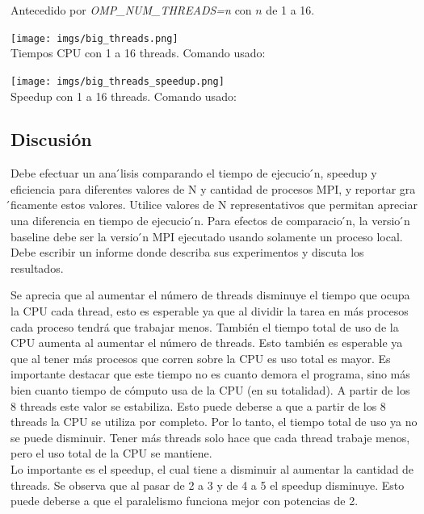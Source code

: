 \documentclass[10pt]{extarticle}
\begin{document}
Antecedido por \textit{OMP\_NUM\_THREADS=n} con $n$ de 1 a 16.\\

\begin{center}
 \texttt{[image: imgs/big\_threads.png]}\\
 \footnotesize{Tiempos CPU con 1 a 16 threads. Comando usado:}\\
\end{center}


\begin{center}
 \texttt{[image: imgs/big\_threads\_speedup.png]}\\
 \footnotesize{Speedup con 1 a 16 threads. Comando usado:}\\
\end{center}

\subsection*{Discusión}
Debe efectuar un ana ́lisis comparando el tiempo de ejecucio ́n, speedup y eficiencia para diferentes valores de N y cantidad de procesos MPI, y reportar gra ́ficamente estos valores. Utilice valores de N representativos que permitan apreciar una diferencia en tiempo de ejecucio ́n.
Para efectos de comparacio ́n, la versio ́n baseline debe ser la versio ́n MPI ejecutado usando solamente un proceso local.
Debe escribir un informe donde describa sus experimentos y discuta los resultados.

Se aprecia que al aumentar el número de threads disminuye el tiempo que ocupa la CPU cada thread, esto es esperable ya que al dividir la tarea en más procesos cada proceso tendrá que trabajar menos. También el tiempo total de uso de la CPU aumenta al aumentar el número de threads. Esto también es esperable ya que al tener más procesos que corren sobre la CPU es uso total es mayor. Es importante destacar que este tiempo no es cuanto demora el programa, sino más bien cuanto tiempo de cómputo usa de la CPU (en su totalidad). A partir de los 8 threads este valor se estabiliza. Esto puede deberse a que a partir de los 8 threads la CPU se utiliza por completo. Por lo tanto, el tiempo total de uso ya no se puede disminuir. Tener más threads solo hace que cada thread trabaje menos, pero el uso total de la CPU se mantiene.\\

Lo importante es el speedup, el cual tiene a disminuir al aumentar la cantidad de threads. Se observa que al pasar de 2 a 3 y de 4 a 5 el speedup disminuye. Esto puede deberse a que el paralelismo funciona mejor con potencias de 2.\\
\end{document}
